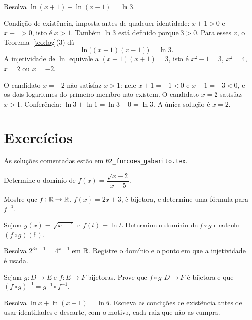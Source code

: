 \documentclass[11pt,a4paper]{article}
\begin{document}
\begin{exemplo}
Resolva $\ln(x+1)+\ln(x-1)=\ln 3$.

Condição de existência, imposta antes de qualquer identidade: $x+1>0$ e $x-1>0$, isto é $x>1$. Também $\ln 3$ está definido porque $3>0$. Para esses $x$, o Teorema~\ref{teo:log}(3) dá
\[
\ln\bigl((x+1)(x-1)\bigr)=\ln 3.
\]
A injetividade de $\ln$ equivale a $(x-1)(x+1)=3$, isto é $x^2-1=3$, $x^2=4$, $x=2$ ou $x=-2$.

O candidato $x=-2$ não satisfaz $x>1$: nele $x+1=-1<0$ e $x-1=-3<0$, e os dois logaritmos do primeiro membro não existem. O candidato $x=2$ satisfaz $x>1$. Conferência: $\ln 3+\ln 1=\ln 3+0=\ln 3$. A única solução é $x=2$.
\end{exemplo}

\section{Exercícios}

As soluções comentadas estão em \texttt{02\_funcoes\_gabarito.tex}.

\begin{exercicio}
Determine o domínio de $f(x)=\dfrac{\sqrt{x-2}}{x-5}$.
\end{exercicio}

\begin{exercicio}
Mostre que $f\colon\mathbb{R}\to\mathbb{R}$, $f(x)=2x+3$, é bijetora, e determine uma fórmula para $f^{-1}$.
\end{exercicio}

\begin{exercicio}
Sejam $g(x)=\sqrt{x-1}$ e $f(t)=\ln t$. Determine o domínio de $f\circ g$ e calcule $(f\circ g)(5)$.
\end{exercicio}

\begin{exercicio}
Resolva $2^{3x-1}=4^{x+1}$ em $\mathbb{R}$. Registre o domínio e o ponto em que a injetividade é usada.
\end{exercicio}

\begin{exercicio}
Sejam $g\colon D\to E$ e $f\colon E\to F$ bijetoras. Prove que $f\circ g\colon D\to F$ é bijetora e que $(f\circ g)^{-1}=g^{-1}\circ f^{-1}$.
\end{exercicio}

\begin{exercicio}
Resolva $\ln x+\ln(x-1)=\ln 6$. Escreva as condições de existência antes de usar identidades e descarte, com o motivo, cada raiz que não as cumpra.
\end{exercicio}
\end{document}
